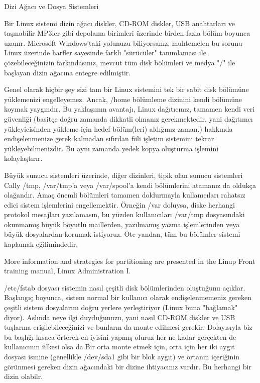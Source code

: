 \begin{section}{Dizi Ağacı ve Dosya Sistemleri}

Bir Linux sistemi dizin ağacı diskler, CD-ROM diskler, USB anahtarları ve taşınabilir MP3ler gibi depolama birimleri üzerinde birden fazla bölüm boyunca uzanır. Microsoft Windows'taki yolunuzu biliyorsanız, muhtemelen bu sorunu Linux üzerinde harfler sayesinde farklı "sürücüler" tanımlaması ile çözebileceğinizin farkındasınız, mevcut tüm disk bölümleri ve medya "/" ile başlayan dizin ağacına entegre edilmiştir.

Genel olarak hiçbir şey sizi tam bir Linux sistemini tek bir sabit disk bölümüne yüklemenizi engelleyemez. Ancak, /home bölümleme dizinini kendi bölümüne koymak yaygındır. Bu yaklaşımın avantajı, Linux dağıtıcınız, tamamen kendi veri güvenliği (basitçe doğru zamanda dikkatli olmanız gerekmektedir, yani dağıtımcı yükleyicisinden yükleme için hedef bölüm(leri) aldığınız zaman.) hakkında endişelenmenize gerek kalmadan sıfırdan fiili işletim sistemini tekrar yükleyebilmenizdir. Bu aynı zamanda yedek kopya oluşturma işlemini kolaylaştırır. 

Büyük sunucu sistemleri üzerinde, diğer dizinleri, tipik olan sunucu sistemleri Cally /tmp, /var/tmp'a veya /var/spool'a kendi bölümlerini atamanız da oldukça olağandır. Amaç önemli bölümleri tamamen doldurmayla kullanıcıları rahatsız edici sistem işlemlerini engellemektir. Örneğin /var doluysa, diske herhangi protokol mesajları yazılamasın, bu yüzden kullanıcıları /var/tmp dosyasındaki okunmamış büyük boyutlu maillerden, yazılmamış yazma işlemlerinden veya büyük dosyalardan korumak istiyoruz. Öte yandan, tüm bu bölümler sistemi kaplamak eğilimindedir.

More information and strategies for partitioning are presented in the Linup
Front training manual, Linux Administration I.

/etc/fstab dosyası sistemin nasıl çeşitli disk bölümlerinden oluştuğunu açıklar. Başlangıç boyunca, sistem normal bir kullanıcı olarak endişelenmemeniz gereken çeşitli sistem dosyalarını doğru yerlere yerleştiriyor (Linux buna "bağlamak" diyor). Aslında neye ilgi duyduğunuzu, yani nasıl CD-ROM diskler ve USB tuşlarına erişilebileceğinizi ve bunların da monte edilmesi gerekir. Dolayısıyla biz bu başlığı kısaca örterek en iyisini yapmış oluruz her ne kadar gerçekten de kullanıcının ülkesi olsa da.Bir orta monte etmek için, orta için her iki aygıt dosyası ismine (genellikle /dev/sda1 gibi bir blok aygıt) ve ortanın içeriğinin görünmesi gereken dizin ağacındaki bir dizine ihtiyacınız vardır. Bu herhangi bir dizin olabilr.


\end{section}

